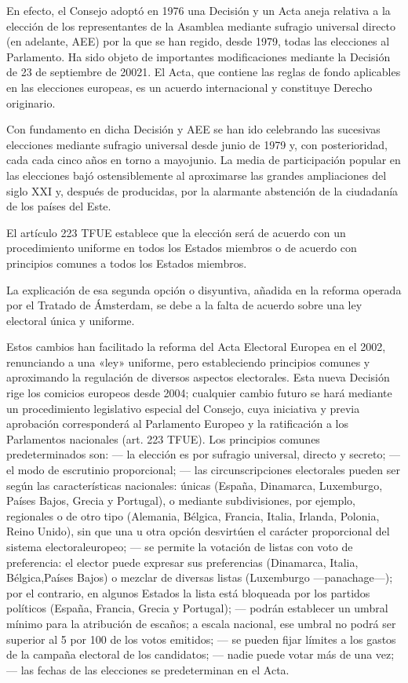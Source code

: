 \documentclass[10pt,a4paper]{article}
\begin{document}
En efecto, el Consejo adoptó en 1976 una Decisión y un Acta aneja relativa a la elección de los representantes de la Asamblea mediante sufragio universal directo (en adelante, AEE) por la que se han regido, desde 1979, todas las elecciones al Parlamento. Ha sido objeto de importantes modificaciones mediante la Decisión de 23 de septiembre de 20021. El Acta, que contiene las reglas de fondo aplicables en las elecciones europeas, es un acuerdo internacional y constituye Derecho originario.

Con fundamento en dicha Decisión y AEE se han ido celebrando las sucesivas elecciones mediante sufragio universal desde junio de 1979 y, con posterioridad, cada cada cinco años en torno a mayojunio. La media de participación popular en las elecciones bajó ostensiblemente al aproximarse las grandes ampliaciones del siglo XXI y, después de producidas, por la alarmante abstención de la ciudadanía de los países del Este.

El artículo 223 TFUE establece que la elección será de acuerdo con un procedimiento uniforme en todos los Estados miembros o de acuerdo con principios comunes a todos los Estados miembros.

La explicación de esa segunda opción o disyuntiva, añadida en la reforma operada por el Tratado de Ámsterdam, se debe a la falta de acuerdo sobre una ley electoral única y uniforme.

Estos cambios han facilitado la reforma del Acta Electoral Europea en el 2002, renunciando a una «ley» uniforme, pero estableciendo principios comunes y aproximando la regulación de diversos aspectos electorales. Esta nueva Decisión rige los comicios europeos desde 2004; cualquier cambio futuro se hará mediante un procedimiento legislativo especial del Consejo, cuya iniciativa y previa aprobación corresponderá al Parlamento Europeo y la ratificación a los Parlamentos nacionales (art. 223 TFUE). Los principios comunes predeterminados son: — la elección es por sufragio universal, directo y secreto; — el modo de escrutinio proporcional; — las circunscripciones electorales pueden ser según las características nacionales: únicas (España, Dinamarca, Luxemburgo, Países Bajos, Grecia y Portugal), o mediante subdivisiones, por ejemplo, regionales o de otro tipo (Alemania, Bélgica, Francia, Italia, Irlanda, Polonia, Reino Unido), sin que una u otra opción desvirtúen el carácter proporcional del sistema electoraleuropeo; — se permite la votación de listas con voto de preferencia: el elector puede expresar sus preferencias (Dinamarca, Italia, Bélgica,Países Bajos) o mezclar de diversas listas (Luxemburgo —panachage—); por el contrario, en algunos Estados la lista está bloqueada por los partidos políticos (España, Francia, Grecia y Portugal); — podrán establecer un umbral mínimo para la atribución de escaños; a escala nacional, ese umbral no podrá ser superior al 5 por 100 de los votos emitidos; — se pueden fijar límites a los gastos de la campaña electoral de los candidatos; — nadie puede votar más de una vez; — las fechas de las elecciones se predeterminan en el Acta.
\end{document}
